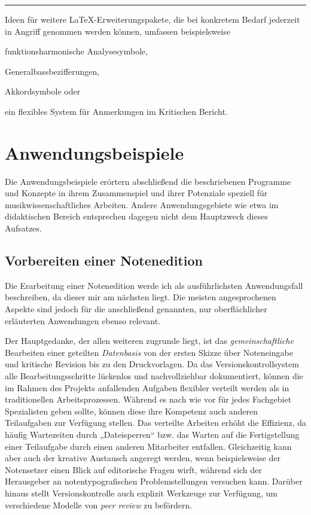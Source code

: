 \documentclass[DIV=12]{scrreprt}
\begin{document}
\bigskip
\hrule
\bigskip
Ideen für weitere \LaTeX-Erweiterungspakete, die bei konkretem Bedarf jederzeit in Angriff genommen werden können, umfassen beispielsweise 

\begin{itemize*}
\item funktionsharmonische Analysesymbole,
\item Generalbassbezifferungen,
\item Akkordsymbole oder
\item ein flexibles System für Anmerkungen im Kritischen Bericht.
\end{itemize*}

\chapter{Anwendungsbeispiele}
\label{chap:pt_applications}

Die Anwendungsbeispiele erörtern abschließend die beschriebenen Programme und Konzepte in ihrem Zusammenspiel und ihrer Potenziale speziell für musikwissenschaftliches Arbeiten.
Andere Anwendungsgebiete wie etwa im didaktischen Bereich entsprechen dagegen nicht dem Hauptzweck dieses Aufsatzes.

\section{Vorbereiten einer Notenedition}
\label{sec:pt_preparing-edition}
Die Erarbeitung einer Notenedition werde ich als ausführlichsten Anwendungsfall beschreiben, da dieser mir am nächsten liegt.
Die meisten angesprochenen Aspekte sind jedoch für die anschließend genannten, nur oberflächlicher erläuterten Anwendungen ebenso relevant.

\medskip
 
Der Hauptgedanke, der allen weiteren zugrunde liegt, ist das \emph{gemeinschaftliche} Bearbeiten einer geteilten \emph{Datenbasis} von der ersten Skizze über Noteneingabe und kritische Revision bis zu den Druckvorlagen.
Da das Versionskontrollsystem alle Bearbeitungsschritte lückenlos und nachvollziehbar dokumentiert, können die im Rahmen des Projekts anfallenden Aufgaben flexibler verteilt werden als in traditionellen Arbeitsprozessen.
Während es nach wie vor für jedes Fachgebiet Spezialisten geben sollte, können diese ihre Kompetenz auch anderen Teilaufgaben zur Verfügung stellen.
Das verteilte Arbeiten erhöht die Effizienz, da häufig Wartezeiten durch „Dateisperren“ bzw. das Warten auf die Fertigstellung einer Teilaufgabe durch einen anderen Mitarbeiter entfallen.
Gleichzeitig kann aber auch der kreative Austausch angeregt werden, wenn beispielsweise der Notensetzer einen Blick auf editorische Fragen wirft, während sich der Herausgeber an notentypografischen Problemstellungen versuchen kann.
Darüber hinaus stellt Versionskontrolle auch explizit Werkzeuge zur Verfügung, um verschiedene Modelle von \emph{peer review} zu befördern.
\end{document}
